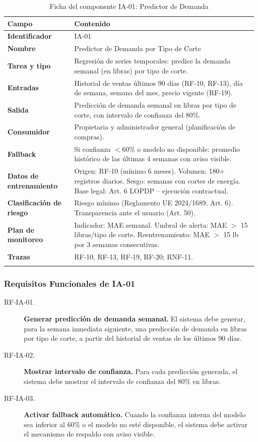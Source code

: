 \documentclass[11pt,a4paper]{article}
\begin{document}
\begin{longtable}{|p{3.5cm}|p{10cm}|}
\hline
\textbf{Campo} & \textbf{Contenido} \\
\hline
\textbf{Identificador} & IA-01 \\
\hline
\textbf{Nombre} & Predictor de Demanda por Tipo de Corte \\
\hline
\textbf{Tarea y tipo} & Regresión de series temporales: predice la demanda semanal (en libras) por tipo de corte. \\
\hline
\textbf{Entradas} & Historial de ventas últimos 90 días (RF-10, RF-13), día de semana, semana del mes, precio vigente (RF-19). \\
\hline
\textbf{Salida} & Predicción de demanda semanal en libras por tipo de corte, con intervalo de confianza del 80\%. \\
\hline
\textbf{Consumidor} & Propietaria y administrador general (planificación de compras). \\
\hline
\textbf{Fallback} & Si confianza $<$60\% o modelo no disponible: promedio histórico de las últimas 4 semanas con aviso visible. \\
\hline
\textbf{Datos de entrenamiento} & Origen: RF-10 (mínimo 6 meses). Volumen: 180+ registros diarios. Sesgo: semanas con cortes de energía. Base legal: Art. 6 LOPDP -- ejecución contractual. \\
\hline
\textbf{Clasificación de riesgo} & Riesgo mínimo (Reglamento UE 2024/1689, Art. 6). Transparencia ante el usuario (Art. 50). \\
\hline
\textbf{Plan de monitoreo} & Indicador: MAE semanal. Umbral de alerta: MAE $>$ 15 libras/tipo de corte. Reentrenamiento: MAE $>$ 15 lb por 3 semanas consecutivas. \\
\hline
\textbf{Trazas} & RF-10, RF-13, RF-19, RF-20; RNF-11. \\
\hline
\caption{Ficha del componente IA-01: Predictor de Demanda}
\label{tab:ia01}
\end{longtable}

\subsubsection{Requisitos Funcionales de IA-01}

\begin{description}
  \item[RF-IA-01.] \textbf{Generar predicción de demanda semanal.} El sistema debe generar, para la semana inmediata siguiente, una predicción de demanda en libras por tipo de corte, a partir del historial de ventas de los últimos 90 días.
  \item[RF-IA-02.] \textbf{Mostrar intervalo de confianza.} Para cada predicción generada, el sistema debe mostrar el intervalo de confianza del 80\% en libras.
  \item[RF-IA-03.] \textbf{Activar fallback automático.} Cuando la confianza interna del modelo sea inferior al 60\% o el modelo no esté disponible, el sistema debe activar el mecanismo de respaldo con aviso visible.
\end{description}
\end{document}
